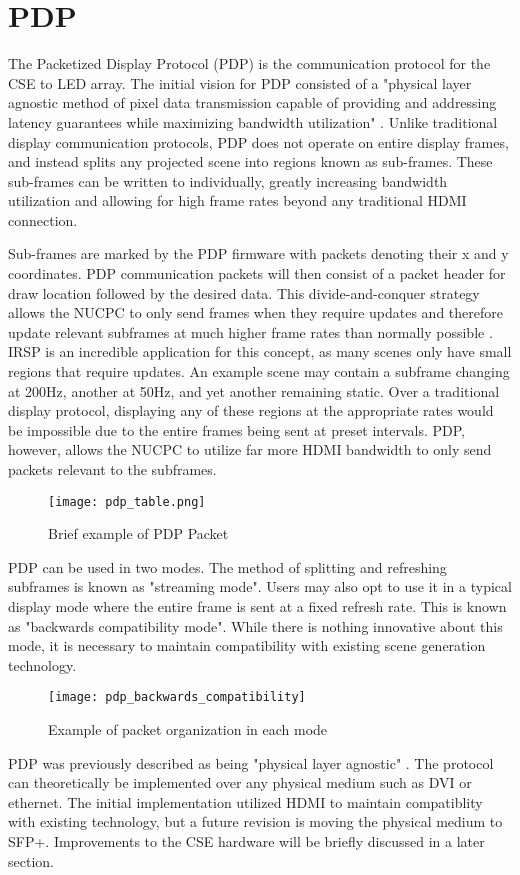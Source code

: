 \section{PDP}
The Packetized Display Protocol (PDP) is the communication protocol for the CSE to LED array. The initial vision for PDP consisted of a "physical layer agnostic method of pixel data transmission capable of providing and addressing latency guarantees while maximizing bandwidth utilization" \cite{pdp_ieee}. Unlike traditional display communication protocols, PDP does not operate on entire display frames, and instead splits any projected scene into regions known as sub-frames. These sub-frames can be written to individually, greatly increasing bandwidth utilization and allowing for high frame rates beyond any traditional HDMI connection. \par
Sub-frames are marked by the PDP firmware with packets denoting their x and y coordinates. PDP communication packets will then consist of a packet header for draw location followed by the desired data. This divide-and-conquer strategy allows the NUCPC to only send frames when they require updates and therefore update relevant subframes at much higher frame rates than normally possible \cite{chris}. IRSP is an incredible application for this concept, as many scenes only have small regions that require updates. An example scene may contain a subframe changing at 200Hz, another at 50Hz, and yet another remaining static. Over a traditional display protocol, displaying any of these regions at the appropriate rates would be impossible due to the entire frames being sent at preset intervals. PDP, however, allows the NUCPC to utilize far more HDMI bandwidth to only send packets relevant to the subframes.\par
\begin{figure}[!htb]
	\texttt{[image: pdp\_table.png]}
	\centering
	\caption{Brief example of PDP Packet}
	\centering
\end{figure}
PDP can be used in two modes. The method of splitting and refreshing subframes is known as "streaming mode". Users may also opt to use it in a typical display mode where the entire frame is sent at a fixed refresh rate. This is known as "backwards compatibility mode". While there is nothing innovative about this mode, it is necessary to maintain compatibility with existing scene generation technology.\par
\begin{figure}[!htb]
	\texttt{[image: pdp\_backwards\_compatibility]}
	\centering
	\caption{Example of packet organization in each mode}
	\centering
\end{figure}
PDP was previously described as being "physical layer agnostic" \cite{pdp_ieee}. The protocol can theoretically be implemented over any physical medium such as DVI or ethernet. The initial implementation utilized HDMI to maintain compatiblity with existing technology, but a future revision is moving the physical medium to SFP+. Improvements to the CSE hardware will be briefly discussed in a later section.